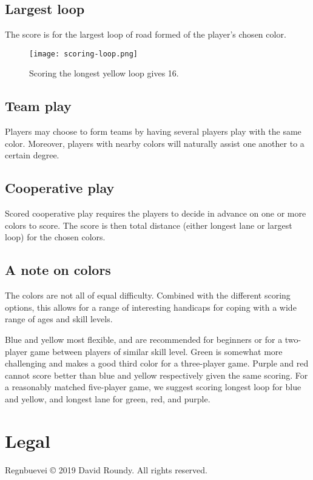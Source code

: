 \documentclass[twocolumn, 11pt]{article}
\begin{document}
\subsection*{Largest loop}
The score is for the largest loop of road formed of the player’s
chosen color.

\begin{figure}[h]
  \texttt{[image: scoring-loop.png]}
  \caption{Scoring the longest yellow loop gives 16.}
\end{figure}

\subsection*{Team play}
Players may choose to form teams by having several players play with
the same color.  Moreover, players with nearby colors will naturally
assist one another to a certain degree.
\subsection*{Cooperative play}
Scored cooperative play requires the players to decide in advance on
one or more colors to score.  The score is then total distance (either
longest lane or largest loop) for the chosen colors.

\subsection*{A note on colors}
The colors are not all of equal difficulty.  Combined with the
different scoring options, this allows for a range of interesting
handicaps for coping with a wide range of ages and skill levels.

Blue and yellow most flexible, and are recommended for
beginners or for a two-player game between players of similar skill
level.  Green is somewhat more challenging and makes a good third
color for a three-player game.  Purple and red cannot score better
than blue and yellow respectively given the same scoring.  For a
reasonably matched five-player game, we suggest scoring longest loop
for blue and yellow, and longest lane for green, red, and purple.

\section*{Legal}
Regnbuevei © 2019 David Roundy. All rights reserved.
\end{document}
